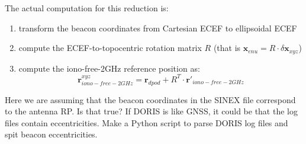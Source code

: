 The actual computation for this reduction is:
\begin{enumerate}
  \item transform the beacon coordinates from Cartesian ECEF to ellipsoidal ECEF
  \item compute the ECEF-to-topocentric rotation matrix $R$ (that is 
    $\bm{x}_{enu} = R \cdot \delta \bm{x}_{xyz}$)
  \item compute the iono-free-2GHz reference position as:
  \begin{equation}
    \bm{r}_{iono-free-2GHz}^{xyz} = \bm{r}_{dpod} + R^T \cdot \bm{r}'_{iono-free-2GHz}
  \end{equation}
\end{enumerate}

{\color{brown}Here we are assuming that the beacon coordinates in the SINEX 
file correspond to the antenna RP. Is that true? If DORIS is like GNSS, it 
could be that the log files contain eccentricities. Make a Python script to 
parse DORIS log files and spit beacon eccentricities.}




